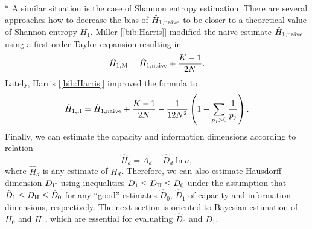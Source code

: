 \\*
A similar situation is the case of Shannon entropy estimation. There are several approaches how to decrease the bias of $\hat{H}_{1,\mbox{\scriptsize{naive}}}$ to be closer to a theoretical value of Shannon entropy $H_{1}$. Miller [\ref{bib:Harris}] modified the naive estimate $\hat{H}_{1,\mbox{\scriptsize{naive}}}$ using a first-order Taylor expansion resulting in
\begin{equation}
\label{eq:miller}
\hat{H}_{1,\mbox{\scriptsize{M}}}=\hat{H}_{1,\mbox{\scriptsize{naive}}} + \frac{K-1}{2N}.
\end{equation}
Lately, Harris [\ref{bib:Harris}] improved the formula to
\begin{equation}
\label{eq:harris1h}
\hat{H}_{1,\mbox{\scriptsize{H}}}=\hat{H}_{1,\mbox{\scriptsize{naive}}} + \frac{K-1}{2N} - \frac{1}{12N^2} \left( 1 - \sum_{p_{j}>0}\frac{1}{p_{j}} \right).
\end{equation}
Finally, we can estimate the capacity and information dimensions according to relation
\begin{equation} 
\label{eq:hjednaest}
\hat{H}_{d}=A_{d} - \hat{D}_{d} \ln{a},
\end{equation} 
where $\hat{H}_{d}$ is any estimate of $H_{d}$. Therefore, we can also estimate Hausdorff dimension $D_{\mbox{\scriptsize{H}}}$ using inequalities $D_{1} \le D_{\mbox{\scriptsize{H}}} \le D_{0}$ under the assumption that $\hat{D}_{1} \le D_{\mbox{\scriptsize{H}}} \le \hat{D}_{0}$ for any ``good'' estimates $\hat{D}_{0}$, $\hat{D}_{1}$ of capacity and information dimensions, respectively. The next section is oriented to Bayesian estimation of $H_{0}$ and $H_{1}$, which are essential for evaluating $\hat{D}_{0}$ and $\hat{D}_{1}$.